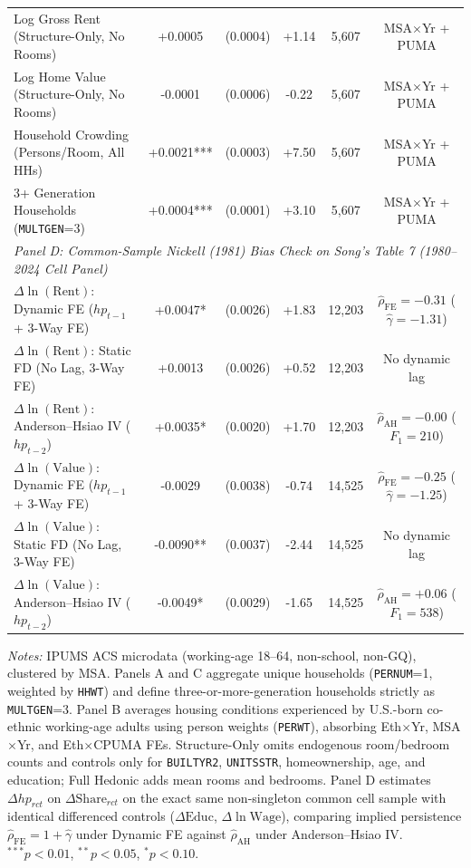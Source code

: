 \begin{table}[t!]
\begin{tabular}{lccccc}
Log Gross Rent (Structure-Only, No Rooms) & +0.0005 & (0.0004) & +1.14 & 5,607 & MSA$\times$Yr + PUMA \\
Log Home Value (Structure-Only, No Rooms) & -0.0001 & (0.0006) & -0.22 & 5,607 & MSA$\times$Yr + PUMA \\
Household Crowding (Persons/Room, All HHs) & +0.0021*** & (0.0003) & +7.50 & 5,607 & MSA$\times$Yr + PUMA \\
3+ Generation Households (\texttt{MULTGEN}=3) & +0.0004*** & (0.0001) & +3.10 & 5,607 & MSA$\times$Yr + PUMA \\
\midrule
\multicolumn{6}{l}{\textit{Panel D: Common-Sample Nickell (1981) Bias Check on Song's Table 7 (1980--2024 Cell Panel)}} \\
$\Delta \ln(\text{Rent})$: Dynamic FE ($hp_{t-1}$ + 3-Way FE) & +0.0047* & (0.0026) & +1.83 & 12,203 & $\hat{\rho}_{\mathrm{FE}}=-0.31$ ($\hat{\gamma}=-1.31$) \\
$\Delta \ln(\text{Rent})$: Static FD (No Lag, 3-Way FE) & +0.0013 & (0.0026) & +0.52 & 12,203 & No dynamic lag \\
$\Delta \ln(\text{Rent})$: Anderson--Hsiao IV ($hp_{t-2}$) & +0.0035* & (0.0020) & +1.70 & 12,203 & $\hat{\rho}_{\mathrm{AH}}=-0.00$ ($F_1=210$) \\
$\Delta \ln(\text{Value})$: Dynamic FE ($hp_{t-1}$ + 3-Way FE) & -0.0029 & (0.0038) & -0.74 & 14,525 & $\hat{\rho}_{\mathrm{FE}}=-0.25$ ($\hat{\gamma}=-1.25$) \\
$\Delta \ln(\text{Value})$: Static FD (No Lag, 3-Way FE) & -0.0090** & (0.0037) & -2.44 & 14,525 & No dynamic lag \\
$\Delta \ln(\text{Value})$: Anderson--Hsiao IV ($hp_{t-2}$) & -0.0049* & (0.0029) & -1.65 & 14,525 & $\hat{\rho}_{\mathrm{AH}}=+0.06$ ($F_1=538$) \\
\bottomrule
\end{tabular}
\begin{minipage}{0.96\linewidth}
\footnotesize\textit{Notes:} IPUMS ACS microdata (working-age 18--64, non-school, non-GQ), clustered by MSA. Panels A and C aggregate unique households (\texttt{PERNUM}=1, weighted by \texttt{HHWT}) and define three-or-more-generation households strictly as \texttt{MULTGEN}=3. Panel B averages housing conditions experienced by U.S.-born co-ethnic working-age adults using person weights (\texttt{PERWT}), absorbing Eth$\times$Yr, MSA$\times$Yr, and Eth$\times$CPUMA FEs. Structure-Only omits endogenous room/bedroom counts and controls only for \texttt{BUILTYR2}, \texttt{UNITSSTR}, homeownership, age, and education; Full Hedonic adds mean rooms and bedrooms. Panel D estimates $\Delta hp_{rct}$ on $\Delta \text{Share}_{rct}$ on the exact same non-singleton common cell sample with identical differenced controls ($\Delta\text{Educ}$, $\Delta\ln\text{Wage}$), comparing implied persistence $\hat{\rho}_{\text{FE}} = 1 + \hat{\gamma}$ under Dynamic FE against $\hat{\rho}_{\text{AH}}$ under Anderson--Hsiao IV. $^{***}p<0.01$, $^{**}p<0.05$, $^{*}p<0.10$.
\end{minipage}
\end{table}
